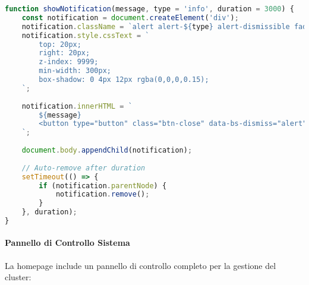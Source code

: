 \documentclass[12pt,a4paper]{article}
\begin{document}
\begin{lstlisting}[language=javascript, caption=Sistema Notifiche]
function showNotification(message, type = 'info', duration = 3000) {
    const notification = document.createElement('div');
    notification.className = `alert alert-${type} alert-dismissible fade show position-fixed`;
    notification.style.cssText = `
        top: 20px;
        right: 20px;
        z-index: 9999;
        min-width: 300px;
        box-shadow: 0 4px 12px rgba(0,0,0,0.15);
    `;
    
    notification.innerHTML = `
        ${message}
        <button type="button" class="btn-close" data-bs-dismiss="alert"></button>
    `;
    
    document.body.appendChild(notification);
    
    // Auto-remove after duration
    setTimeout(() => {
        if (notification.parentNode) {
            notification.remove();
        }
    }, duration);
}
\end{lstlisting}

\paragraph{Pannello di Controllo Sistema}
La homepage include un pannello di controllo completo per la gestione del cluster:
\end{document}
